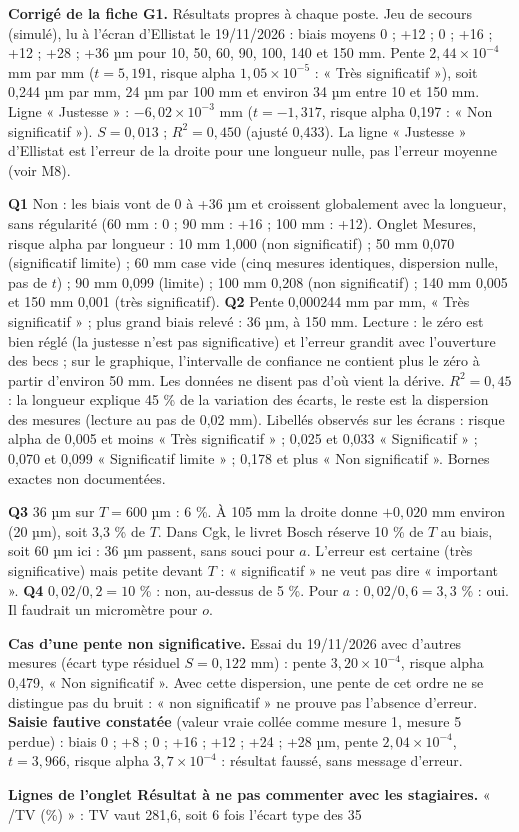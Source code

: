 \textbf{\color{ok}Corrigé de la fiche G1.} Résultats propres à chaque poste. Jeu de secours (simulé), lu à l'écran d'Ellistat le 19/11/2026 : biais moyens 0 ; +12 ; 0 ; +16 ; +12 ; +28 ; +36 µm pour 10, 50, 60, 90, 100, 140 et 150 mm. Pente $2{,}44 \times 10^{-4}$ mm par mm ($t = 5{,}191$, risque alpha $1{,}05 \times 10^{-5}$ : « Très significatif »), soit 0,244 µm par mm, 24 µm par 100 mm et environ 34 µm entre 10 et 150 mm. Ligne « Justesse » : $-6{,}02 \times 10^{-3}$ mm ($t = -1{,}317$, risque alpha 0,197 : « Non significatif »). $S = 0{,}013$ ; $R^2 = 0{,}450$ (ajusté 0,433). La ligne « Justesse » d'Ellistat est l'erreur de la droite pour une longueur nulle, pas l'erreur moyenne (voir M8).\par \textbf{Q1} Non : les biais vont de 0 à +36 µm et croissent globalement avec la longueur, sans régularité (60 mm : 0 ; 90 mm : +16 ; 100 mm : +12). Onglet Mesures, risque alpha par longueur : 10 mm 1,000 (non significatif) ; 50 mm 0,070 (significatif limite) ; 60 mm case vide (cinq mesures identiques, dispersion nulle, pas de $t$) ; 90 mm 0,099 (limite) ; 100 mm 0,208 (non significatif) ; 140 mm 0,005 et 150 mm 0,001 (très significatif). \textbf{Q2} Pente 0,000244 mm par mm, « Très significatif » ; plus grand biais relevé : 36 µm, à 150 mm. Lecture : le zéro est bien réglé (la justesse n'est pas significative) et l'erreur grandit avec l'ouverture des becs ; sur le graphique, l'intervalle de confiance ne contient plus le zéro à partir d'environ 50 mm. Les données ne disent pas d'où vient la dérive. $R^2 = 0{,}45$ : la longueur explique 45 \% de la variation des écarts, le reste est la dispersion des mesures (lecture au pas de 0,02 mm). Libellés observés sur les écrans : risque alpha de 0,005 et moins « Très significatif » ; 0,025 et 0,033 « Significatif » ; 0,070 et 0,099 « Significatif limite » ; 0,178 et plus « Non significatif ». Bornes exactes non documentées.\par \textbf{Q3} 36 µm sur $T = 600$ µm : 6 \%. À 105 mm la droite donne $+0{,}020$ mm environ (20 µm), soit 3,3 \% de $T$. Dans Cgk, le livret Bosch réserve 10 \% de $T$ au biais, soit 60 µm ici : 36 µm passent, sans souci pour $a$. L'erreur est certaine (très significative) mais petite devant $T$ : « significatif » ne veut pas dire « important ». \textbf{Q4} $0{,}02 / 0{,}2 = 10$ \% : non, au-dessus de 5 \%. Pour $a$ : $0{,}02 / 0{,}6 = 3{,}3$ \% : oui. Il faudrait un micromètre pour $o$.\par \textbf{Cas d'une pente non significative.} Essai du 19/11/2026 avec d'autres mesures (écart type résiduel $S = 0{,}122$ mm) : pente $3{,}20 \times 10^{-4}$, risque alpha 0,479, « Non significatif ». Avec cette dispersion, une pente de cet ordre ne se distingue pas du bruit : « non significatif » ne prouve pas l'absence d'erreur. \textbf{Saisie fautive constatée} (valeur vraie collée comme mesure 1, mesure 5 perdue) : biais 0 ; +8 ; 0 ; +16 ; +12 ; +24 ; +28 µm, pente $2{,}04 \times 10^{-4}$, $t = 3{,}966$, risque alpha $3{,}7 \times 10^{-4}$ : résultat faussé, sans message d'erreur.\par \textbf{Lignes de l'onglet Résultat à ne pas commenter avec les stagiaires.} « /TV (\%) » : TV vaut 281,6, soit 6 fois l'écart type des 35 